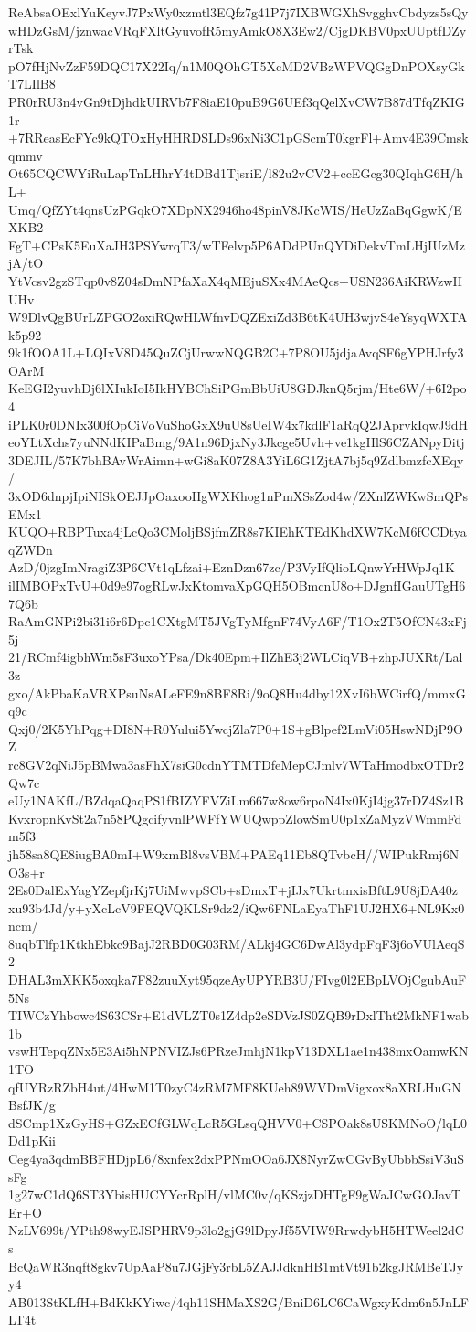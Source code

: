 ReAbsaOExlYuKeyvJ7PxWy0xzmtl3EQfz7g41P7j7IXBWGXhSvgghvCbdyzs5sQy
wHDzGsM/jznwacVRqFXltGyuvofR5myAmkO8X3Ew2/CjgDKBV0pxUUptfDZyrTsk
pO7fHjNvZzF59DQC17X22Iq/n1M0QOhGT5XcMD2VBzWPVQGgDnPOXsyGkT7LIlB8
PR0rRU3n4vGn9tDjhdkUIRVb7F8iaE10puB9G6UEf3qQelXvCW7B87dTfqZKIG1r
+7RReasEcFYc9kQTOxHyHHRDSLDs96xNi3C1pGScmT0kgrFl+Amv4E39Cmskqmmv
Ot65CQCWYiRuLapTnLHhrY4tDBd1TjsriE/l82u2vCV2+ccEGcg30QIqhG6H/hL+
Umq/QfZYt4qnsUzPGqkO7XDpNX2946ho48pinV8JKcWIS/HeUzZaBqGgwK/EXKB2
FgT+CPsK5EuXaJH3PSYwrqT3/wTFelvp5P6ADdPUnQYDiDekvTmLHjIUzMzjA/tO
YtVcsv2gzSTqp0v8Z04sDmNPfaXaX4qMEjuSXx4MAeQcs+USN236AiKRWzwIIUHv
W9DlvQgBUrLZPGO2oxiRQwHLWfnvDQZExiZd3B6tK4UH3wjvS4eYsyqWXTAk5p92
9k1fOOA1L+LQIxV8D45QuZCjUrwwNQGB2C+7P8OU5jdjaAvqSF6gYPHJrfy3OArM
KeEGI2yuvhDj6lXIukIoI5IkHYBChSiPGmBbUiU8GDJknQ5rjm/Hte6W/+6I2po4
iPLK0r0DNIx300fOpCiVoVuShoGxX9uU8sUeIW4x7kdlF1aRqQ2JAprvkIqwJ9dH
eoYLtXchs7yuNNdKIPaBmg/9A1n96DjxNy3Jkcge5Uvh+ve1kgHlS6CZANpyDitj
3DEJIL/57K7bhBAvWrAimn+wGi8aK07Z8A3YiL6G1ZjtA7bj5q9ZdlbmzfcXEqy/
3xOD6dnpjIpiNISkOEJJpOaxooHgWXKhog1nPmXSsZod4w/ZXnlZWKwSmQPsEMx1
KUQO+RBPTuxa4jLcQo3CMoljBSjfmZR8s7KIEhKTEdKhdXW7KcM6fCCDtyaqZWDn
AzD/0jzgImNragiZ3P6CVt1qLfzai+EznDzn67zc/P3VyIfQlioLQnwYrHWpJq1K
ilIMBOPxTvU+0d9e97ogRLwJxKtomvaXpGQH5OBmcnU8o+DJgnfIGauUTgH67Q6b
RaAmGNPi2bi31i6r6Dpc1CXtgMT5JVgTyMfgnF74VyA6F/T1Ox2T5OfCN43xFj5j
21/RCmf4igbhWm5sF3uxoYPsa/Dk40Epm+IlZhE3j2WLCiqVB+zhpJUXRt/Lal3z
gxo/AkPbaKaVRXPsuNsALeFE9n8BF8Ri/9oQ8Hu4dby12XvI6bWCirfQ/mmxGq9c
Qxj0/2K5YhPqg+DI8N+R0Yului5YwcjZla7P0+1S+gBlpef2LmVi05HswNDjP9OZ
rc8GV2qNiJ5pBMwa3asFhX7siG0cdnYTMTDfeMepCJmlv7WTaHmodbxOTDr2Qw7c
eUy1NAKfL/BZdqaQaqPS1fBIZYFVZiLm667w8ow6rpoN4Ix0KjI4jg37rDZ4Sz1B
KvxropnKvSt2a7n58PQgcifyvnlPWFfYWUQwppZlowSmU0p1xZaMyzVWmmFdm5f3
jh58sa8QE8iugBA0mI+W9xmBl8vsVBM+PAEq11Eb8QTvbcH//WIPukRmj6NO3s+r
2Es0DalExYagYZepfjrKj7UiMwvpSCb+sDmxT+jIJx7UkrtmxisBftL9U8jDA40z
xu93b4Jd/y+yXcLcV9FEQVQKLSr9dz2/iQw6FNLaEyaThF1UJ2HX6+NL9Kx0ncm/
8uqbTlfp1KtkhEbkc9BajJ2RBD0G03RM/ALkj4GC6DwAl3ydpFqF3j6oVUlAeqS2
DHAL3mXKK5oxqka7F82zuuXyt95qzeAyUPYRB3U/FIvg0l2EBpLVOjCgubAuF5Ns
TIWCzYhbowc4S63CSr+E1dVLZT0s1Z4dp2eSDVzJS0ZQB9rDxlTht2MkNF1wab1b
vswHTepqZNx5E3Ai5hNPNVIZJs6PRzeJmhjN1kpV13DXL1ae1n438mxOamwKN1TO
qfUYRzRZbH4ut/4HwM1T0zyC4zRM7MF8KUeh89WVDmVigxox8aXRLHuGNBsfJK/g
dSCmp1XzGyHS+GZxECfGLWqLcR5GLsqQHVV0+CSPOak8sUSKMNoO/lqL0Dd1pKii
Ceg4ya3qdmBBFHDjpL6/8xnfex2dxPPNmOOa6JX8NyrZwCGvByUbbbSsiV3uSsFg
1g27wC1dQ6ST3YbisHUCYYcrRplH/vlMC0v/qKSzjzDHTgF9gWaJCwGOJavTEr+O
NzLV699t/YPth98wyEJSPHRV9p3lo2gjG9lDpyJf55VIW9RrwdybH5HTWeel2dCs
BcQaWR3nqft8gkv7UpAaP8u7JGjFy3rbL5ZAJJdknHB1mtVt91b2kgJRMBeTJyy4
AB013StKLfH+BdKkKYiwc/4qh11SHMaXS2G/BniD6LC6CaWgxyKdm6n5JnLFLT4t
